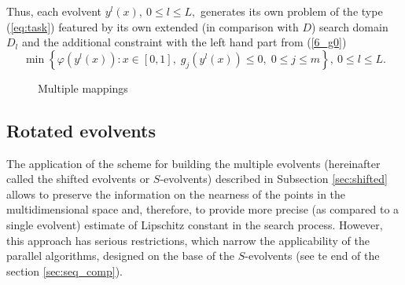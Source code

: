 \documentclass[runningheads]{llncs}
\begin{document}
Thus, each evolvent $y^l(x),\ 0\leq l \leq L,$ generates its own problem of the type
(\ref{eq:task}) featured by its own extended (in comparison with $D$) search domain $D_l$
and the additional constraint with the left hand part from (\ref{6_g0})
\begin{equation}\label{6_problem_l}
\min{\left\{\varphi(y^l(x)):x\in [0,1], \; g_j(y^l(x))\leq 0, \; 0 \leq j \leq m\right\}}, \ 0 \leq l \leq L.
\end{equation}

\begin{figure}[ht]
    \centering
    \caption{Multiple mappings}
\end{figure}

\subsection{Rotated evolvents}
The application of the scheme for building the multiple evolvents (hereinafter called the shifted
evolvents or $S$-evolvents) described in Subsection \ref{sec:shifted} allows to preserve the
information on the nearness of the points in the multidimensional space and, therefore, to
provide more precise (as compared to a single evolvent) estimate of Lipschitz constant in the
search process. However, this approach has serious restrictions, which narrow the applicability
of the parallel algorithms, designed on the base of the $S$-evolvents (see te end of the section
\ref{sec:seq_comp}).
\end{document}
